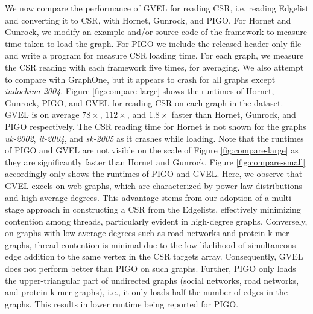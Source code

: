 We now compare the performance of GVEL for reading CSR, i.e. reading Edgelist and converting it to CSR, with Hornet, Gunrock, and PIGO. For Hornet and Gunrock, we modify an example and/or source code of the framework to measure time taken to load the graph. For PIGO we include the released header-only file and write a program for measure CSR loading time. For each graph, we measure the CSR reading with each framework five times, for averaging. We also attempt to compare with GraphOne, but it appears to crash for all graphs except \textit{indochina-2004}. Figure \ref{fig:compare-large} shows the runtimes of Hornet, Gunrock, PIGO, and GVEL for reading CSR on each graph in the dataset. GVEL is on average $78\times$, $112\times$, and $1.8\times$ faster than Hornet, Gunrock, and PIGO respectively. The CSR reading time for Hornet is not shown for the graphs \textit{uk-2002}, \textit{it-2004}, and \textit{sk-2005} as it crashes while loading. Note that the runtimes of PIGO and GVEL are not visible on the scale of Figure \ref{fig:compare-large} as they are significantly faster than Hornet and Gunrock. Figure \ref{fig:compare-small} accordingly only shows the runtimes of PIGO and GVEL. Here, we observe that GVEL excels on web graphs, which are characterized by power law distributions and high average degrees. This advantage stems from our adoption of a multi-stage approach in constructing a CSR from the Edgelists, effectively minimizing contention among threads, particularly evident in high-degree graphs. Conversely, on graphs with low average degrees such as road networks and protein k-mer graphs, thread contention is minimal due to the low likelihood of simultaneous edge addition to the same vertex in the CSR targets array. Consequently, GVEL does not perform better than PIGO on such graphs. Further, PIGO only loads the upper-triangular part of undirected graphs (social networks, road networks, and protein k-mer graphs), i.e., it only loads half the number of edges in the graphs. This results in lower runtime being reported for PIGO.








